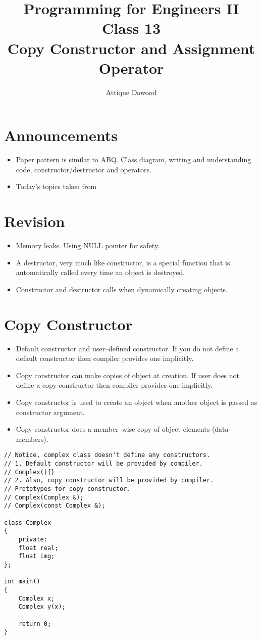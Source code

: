 \documentclass[12pt,a4paper]{article}
\title{\vspace{-2cm}Programming for Engineers II\\Class 13\\Copy Constructor and Assignment Operator}
\author{Attique Dawood}
\begin{document}
\maketitle
\section{Announcements}
\begin{itemize}
\item Paper pattern is similar to ABQ. Class diagram, writing and understanding code, constructor/destructor and operators.
\item Today's topics taken from \cite{Ref:CPP-Copy-Constructor-and-Assignment-Operator}
\end{itemize}
\section{Revision}
\begin{itemize}
\item Memory leaks. Using NULL pointer for safety.
\item A destructor, very much like constructor, is a special function that is automatically called every time an object is destroyed.
\item Constructor and destructor calls when dynamically creating objects.
\end{itemize}
\section{Copy Constructor}
\begin{itemize}
\item Default constructor and user--defined constructor. If you do not define a default constructor then compiler provides one implicitly.
\item Copy constructor can make copies of object at creation. If user does not define a copy constructor then compiler provides one implicitly.
\item Copy constructor is used to create an object when another object is passed as constructor argument.
\item Copy constructor does a member--wise copy of object elements (data members).
\end{itemize}
\begin{lstlisting}[caption={Copy Constructor}]
// Notice, complex class doesn't define any constructors.
// 1. Default constructor will be provided by compiler.
// Complex(){}
// 2. Also, copy constructor will be provided by compiler.
// Prototypes for copy constructor.
// Complex(Complex &);
// Complex(const Complex &);

class Complex
{
	private:
	float real;
	float img;
};

int main()
{
	Complex x;
	Complex y(x);
	
	return 0;
}
\end{lstlisting}
\end{document}
